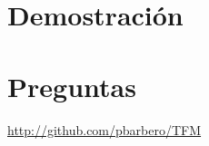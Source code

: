 \documentclass[10pt, spanish]{beamer}
\begin{document}
\section{Demostraci\'on}
\begin{frame}

\end{frame}

\section{Preguntas}

\begin{frame}
	\begin{center}
		\href{http://github.com/pbarbero/TFM}{http://github.com/pbarbero/TFM}
	\end{center}
\end{frame}
\end{document}
